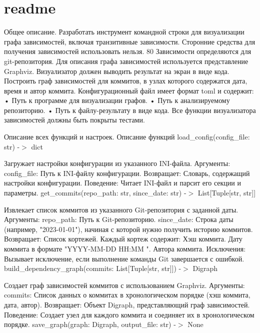 \chapter{readme}
\label{md__c_1_2prj_2python_2_f_semylator_2task2_2git_2readme}

\begin{DoxyEnumerate}
\item Общее описание. Разработать инструмент командной строки для визуализации графа зависимостей, включая транзитивные зависимости. Сторонние средства для получения зависимостей использовать нельзя. 80 Зависимости определяются для git-\/репозитория. Для описания графа зависимостей используется представление Graphviz. Визуализатор должен выводить результат на экран в виде кода. Построить граф зависимостей для коммитов, в узлах которого содержатся дата, время и автор коммита. Конфигурационный файл имеет формат toml и содержит\+: • Путь к программе для визуализации графов. • Путь к анализируемому репозиторию. • Путь к файлу-\/результату в виде кода. Все функции визуализатора зависимостей должны быть покрыты тестами.
\item Описание всех функций и настроек. Описание функций load\+\_\+config(config\+\_\+file\+: str) -\/$>$ dict
\end{DoxyEnumerate}

Загружает настройки конфигурации из указанного INI-\/файла. Аргументы\+: config\+\_\+file\+: Путь к INI-\/файлу конфигурации. Возвращает\+: Словарь, содержащий настройки конфигурации. Поведение\+: Читает INI-\/файл и парсит его секции и параметры. get\+\_\+commits(repo\+\_\+path\+: str, since\+\_\+date\+: str) -\/$>$ List[Tuple[str, str]]

Извлекает список коммитов из указанного Git-\/репозитория с заданной даты. Аргументы\+: repo\+\_\+path\+: Путь к Git-\/репозиторию. since\+\_\+date\+: Строка даты (например, "{}2023-\/01-\/01"{}), начиная с которой нужно получить историю коммитов. Возвращает\+: Список кортежей. Каждый кортеж содержит\+: Хэш коммита. Дату коммита в формате "{}\+YYYY-\/\+MM-\/\+DD HH\+:\+MM "{}. Автора коммита. Исключения\+: Вызывает исключение, если выполнение команды Git завершается с ошибкой. build\+\_\+dependency\+\_\+graph(commits\+: List[\+Tuple[str, str]]) -\/$>$ Digraph

Создает граф зависимостей коммитов с использованием Graphviz. Аргументы\+: commits\+: Список данных о коммитах в хронологическом порядке (хэш коммита, дата, автор). Возвращает\+: Объект Digraph, представляющий граф зависимостей. Поведение\+: Создает узел для каждого коммита и соединяет их в хронологическом порядке. save\+\_\+graph(graph\+: Digraph, output\+\_\+file\+: str) -\/$>$ None

